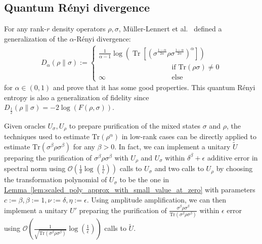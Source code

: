 \documentclass[journal]{IEEEtran}
\newcommand{\lem}[1]{\hyperref[lem:#1]{Lemma~\ref*{lem:#1}}}
\begin{document}
\subsection{Quantum R{\'e}nyi divergence}
\noindent
For any rank-$r$ density operators $\rho,\sigma$, M{\"u}ller-Lennert et al.~\cite{muller2013quantum} defined a generalization of the $\alpha$-R{\'e}nyi divergence:
\begin{align}
D_\alpha(\rho \| \sigma):= \begin{cases}\frac{1}{\alpha-1} \log \left( \operatorname{Tr}\left[\left(\sigma^{\frac{1-\alpha}{2 \alpha}} \rho \sigma^{\frac{1-\alpha}{2 \alpha}}\right)^\alpha\right]\right) \\ \qquad\qquad\qquad\qquad\qquad \text { if } \mathrm{Tr}(\rho\sigma)\neq 0 \\ \infty \qquad\qquad\quad\qquad\qquad \text { else }\end{cases}
\end{align}for $\alpha \in(0, 1)$ and prove that it has some good properties. This quantum R{\'e}nyi entropy is also a generalization of fidelity since $D_{\frac{1}{2}}(\rho\|\sigma) = -2\log(F(\rho,\sigma))$. 

Given oracles $U_{\sigma},U_{\rho}$ to prepare purification of the mixed states $\sigma$ and $\rho$, the techniques used to estimate $\mathrm{Tr}(\rho^{\alpha})$ in low-rank cases can be directly applied to estimate $\mathrm{Tr}(\sigma^{\beta}\rho\sigma^{\beta})$ for any  $\beta > 0$. In fact, we can implement a unitary $\tilde{U}$ preparing the purification of $\sigma^{\beta}\rho\sigma^{\beta}$ with $U_{\rho}$ and $U_{\sigma}$ within $\delta^\beta + \epsilon$ additive error in spectral norm using $\mathcal{O}\left(\frac{1}{\delta}\log(\frac{1}{\epsilon})\right)$ calls to $U_{\sigma}$ and two calls to $U_{\rho}$ by choosing the transformation polynomial of $U_\sigma$ to be the one in \lem{scaled_poly_approx_with_small_value_at_zero} with parameters $c:=\beta,\beta:=1,\nu:=\delta,\eta:=\epsilon$. Using amplitude amplification, we can then implement a unitary $U'$ preparing the purification of $\frac{\sigma^{\beta}\rho\sigma^{\beta}}{\mathrm{Tr}(\sigma^{\beta}\rho\sigma^{\beta})}$ within $\epsilon$ error using $\mathcal{O}(\frac{1}{\sqrt{\mathrm{Tr}(\sigma^{\beta}\rho\sigma^{\beta})}}\log(\frac{1}{\epsilon}))$ calls to $\tilde{U}$. 
\end{document}
